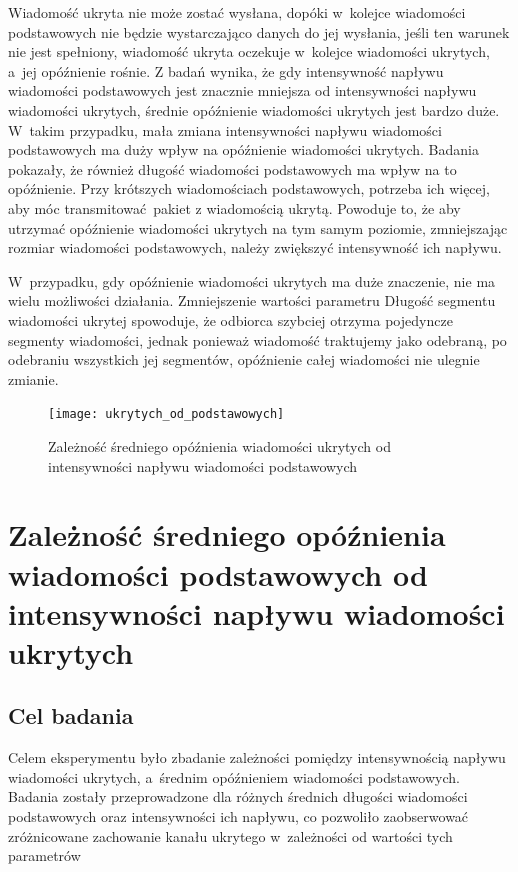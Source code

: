 \documentclass[a4paper, twoside, 12pt]{report}
\begin{document}
            Wiadomość ukryta nie może zostać wysłana, dopóki w~kolejce wiadomości
            podstawowych nie będzie wystarczająco danych do jej wysłania, jeśli ten
            warunek nie jest spełniony, wiadomość ukryta oczekuje w~kolejce wiadomości
            ukrytych, a~jej opóźnienie rośnie. Z badań wynika, że gdy intensywność
            napływu wiadomości podstawowych jest znacznie mniejsza od intensywności
            napływu wiadomości ukrytych, średnie opóźnienie wiadomości ukrytych jest
            bardzo duże. W~takim przypadku, mała zmiana intensywności napływu wiadomości
            podstawowych ma duży wpływ na opóźnienie wiadomości ukrytych. Badania
            pokazały, że również długość wiadomości podstawowych ma wpływ na to opóźnienie.
            Przy krótszych wiadomościach podstawowych, potrzeba ich więcej, aby móc
            transmitować pakiet z wiadomością ukrytą. Powoduje to, że aby utrzymać
            opóźnienie wiadomości ukrytych na tym samym poziomie, zmniejszając rozmiar
            wiadomości podstawowych, należy zwiększyć intensywność ich napływu.

            W~przypadku, gdy opóźnienie wiadomości ukrytych ma duże znaczenie,
            nie ma wielu możliwości działania. Zmniejszenie wartości parametru Długość
            segmentu wiadomości ukrytej spowoduje, że odbiorca szybciej otrzyma
            pojedyncze segmenty wiadomości, jednak ponieważ wiadomość traktujemy jako odebraną,
            po odebraniu wszystkich jej segmentów, opóźnienie całej wiadomości
            nie ulegnie zmianie.

        \begin{figure}[h]
                \centering
                \texttt{[image: ukrytych\_od\_podstawowych]}
                \caption{Zależność średniego opóźnienia wiadomości ukrytych od
                    intensywności napływu wiadomości podstawowych}
                \label{OPOZNIENIEUKRYTYCHODPODSTAWOWYCH}
        \end{figure}

    \section{Zależność średniego opóźnienia wiadomości podstawowych od intensywności napływu wiadomości ukrytych} \label{OPOZNIENEPODSTAWOWYCHODUKRYTYCH}
        \subsection{Cel badania}
            Celem eksperymentu było zbadanie zależności pomiędzy intensywnością
            napływu wiadomości ukrytych, a~średnim opóźnieniem wiadomości podstawowych.
            Badania zostały przeprowadzone dla różnych średnich długości wiadomości
            podstawowych oraz intensywności ich napływu, co pozwoliło zaobserwować
            zróżnicowane zachowanie kanału ukrytego w~zależności od wartości tych
            parametrów
\end{document}
